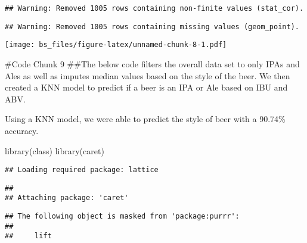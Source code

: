 \documentclass[
]{article}
\newenvironment{Shaded}{\begin{snugshade}}{\end{snugshade}}
\newcommand{\FunctionTok}[1]{\textcolor[rgb]{0.00,0.00,0.00}{#1}}
\newcommand{\NormalTok}[1]{#1}
\begin{document}
\begin{verbatim}
## Warning: Removed 1005 rows containing non-finite values (stat_cor).
\end{verbatim}

\begin{verbatim}
## Warning: Removed 1005 rows containing missing values (geom_point).
\end{verbatim}

\texttt{[image: bs\_files/figure-latex/unnamed-chunk-8-1.pdf]}

\#Code Chunk 9 \#\#The below code filters the overall data set to only
IPAs and Ales as well as imputes median values based on the style of the
beer. We then created a KNN model to predict if a beer is an IPA or Ale
based on IBU and ABV.

Using a KNN model, we were able to predict the style of beer with a
90.74\% accuracy.

\begin{Shaded}
\begin{Highlighting}[]
\FunctionTok{library}\NormalTok{(class)}
\FunctionTok{library}\NormalTok{(caret)}
\end{Highlighting}
\end{Shaded}

\begin{verbatim}
## Loading required package: lattice
\end{verbatim}

\begin{verbatim}
## 
## Attaching package: 'caret'
\end{verbatim}

\begin{verbatim}
## The following object is masked from 'package:purrr':
## 
##     lift
\end{verbatim}
\end{document}
